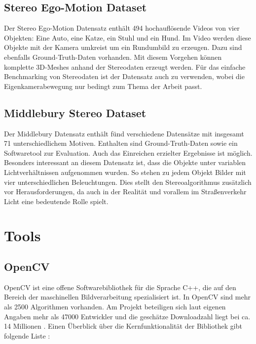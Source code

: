 \subsection*{Stereo Ego-Motion Dataset}

Der Stereo Ego-Motion Datensatz enth\"alt 494 hochaufl\"osende Videos von vier Objekten: Eine Auto, eine Katze, ein Stuhl und ein Hund. Im Video werden diese Objekte  mit der Kamera umkreist um ein Rundumbild zu erzeugen. Dazu sind ebenfalls Ground-Truth-Daten vorhanden. Mit diesem Vorgehen k\"onnen komplette 3D-Meshes anhand der Stereodaten erzeugt werden. F\"ur das einfache Benchmarking von Stereodaten ist der Datensatz auch zu verwenden, wobei die Eigenkamerabewegung nur bedingt zum Thema der Arbeit passt. 

\subsection*{Middlebury Stereo Dataset}

Der Middlebury Datensatz enth\"alt f\"und verschiedene Datens\"atze mit insgesamt 71 unterschiedlichem Motiven. Enthalten sind Ground-Truth-Daten sowie ein Softwaretool zur Evaluation. Auch das Einreichen erzielter Ergebnisse ist m\"oglich. Besonders interessant an diesem Datensatz ist, dass die Objekte unter variablen Lichtverh\"altnissen aufgenommen wurden. So stehen zu jedem Objekt Bilder mit vier unterschiedlichen Beleuchtungen. Dies stellt den Stereoalgorithmus zus\"atzlich vor Herausforderungen, da auch in der Realit\"at und vorallem im Stra\ss{}enverkehr Licht eine bedeutende Rolle spielt.


\newpage
\section{Tools}
\subsection*{OpenCV}
OpenCV ist eine offene Softwarebibliothek f\"ur die Sprache C++, die auf den Bereich der maschinellen Bildverarbeitung spezialisiert ist. In OpenCV sind mehr als 2500 Algorithmen vorhanden. Am Projekt beteiligen sich laut eigenen Angaben mehr als 47000 Entwickler und die gesch\"atze Downloadzahl liegt bei ca. 14 Millionen \cite{opencv}. Einen \"Uberblick \"uber die Kernfunktionalit\"at der Bibliothek gibt folgende Liste \cite{opencv_nvidia, opencv_wikipedia}:

